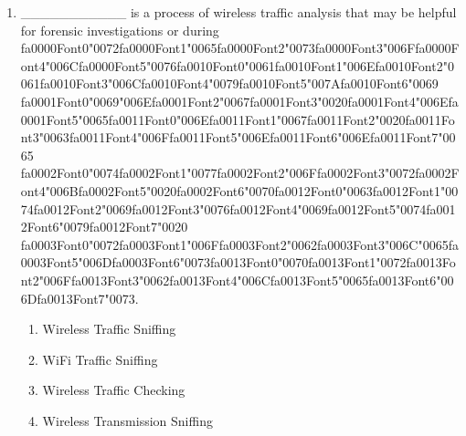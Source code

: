 \documentclass[12pt]{article}
\begin{document}
\begin{enumerate}[label=\arabic*.]
\item \_\_\_\_\_\_\_\_\_\_\_ is a process of wireless traffic analysis that may be helpful for forensic investigations or during {\csname fa0000Font0\endcsname\char"0072}{\csname fa0000Font1\endcsname\char"0065}{\csname fa0000Font2\endcsname\char"0073}{\csname fa0000Font3\endcsname\char"006F}{\csname fa0000Font4\endcsname\char"006C}{\csname fa0000Font5\endcsname\char"0076}{\csname fa0010Font0\endcsname\char"0061}{\csname fa0010Font1\endcsname\char"006E}{\csname fa0010Font2\endcsname\char"0061}{\csname fa0010Font3\endcsname\char"006C}{\csname fa0010Font4\endcsname\char"0079}{\csname fa0010Font5\endcsname\char"007A}{\csname fa0010Font6\endcsname\char"0069} {\csname fa0001Font0\endcsname\char"0069}{\char"006E}{\csname fa0001Font2\endcsname\char"0067}{\csname fa0001Font3\endcsname\char"0020}{\csname fa0001Font4\endcsname\char"006E}{\csname fa0001Font5\endcsname\char"0065}{\csname fa0011Font0\endcsname\char"006E}{\csname fa0011Font1\endcsname\char"0067}{\csname fa0011Font2\endcsname\char"0020}{\csname fa0011Font3\endcsname\char"0063}{\csname fa0011Font4\endcsname\char"006F}{\csname fa0011Font5\endcsname\char"006E}{\csname fa0011Font6\endcsname\char"006E}{\csname fa0011Font7\endcsname\char"0065} {\csname fa0002Font0\endcsname\char"0074}{\csname fa0002Font1\endcsname\char"0077}{\csname fa0002Font2\endcsname\char"006F}{\csname fa0002Font3\endcsname\char"0072}{\csname fa0002Font4\endcsname\char"006B}{\csname fa0002Font5\endcsname\char"0020}{\csname fa0002Font6\endcsname\char"0070}{\csname fa0012Font0\endcsname\char"0063}{\csname fa0012Font1\endcsname\char"0074}{\csname fa0012Font2\endcsname\char"0069}{\csname fa0012Font3\endcsname\char"0076}{\csname fa0012Font4\endcsname\char"0069}{\csname fa0012Font5\endcsname\char"0074}{\csname fa0012Font6\endcsname\char"0079}{\csname fa0012Font7\endcsname\char"0020} {\csname fa0003Font0\endcsname\char"0072}{\csname fa0003Font1\endcsname\char"006F}{\csname fa0003Font2\endcsname\char"0062}{\csname fa0003Font3\endcsname\char"006C}{\char"0065}{\csname fa0003Font5\endcsname\char"006D}{\csname fa0003Font6\endcsname\char"0073}{\csname fa0013Font0\endcsname\char"0070}{\csname fa0013Font1\endcsname\char"0072}{\csname fa0013Font2\endcsname\char"006F}{\csname fa0013Font3\endcsname\char"0062}{\csname fa0013Font4\endcsname\char"006C}{\csname fa0013Font5\endcsname\char"0065}{\csname fa0013Font6\endcsname\char"006D}{\csname fa0013Font7\endcsname\char"0073}.
\begin{enumerate}[label=(\alph*)]
    \item Wireless Traffic Sniffing
    \item WiFi Traffic Sniffing
    \item Wireless Traffic Checking
    \item Wireless Transmission Sniffing
\end{enumerate}
\end{enumerate}
\end{document}
